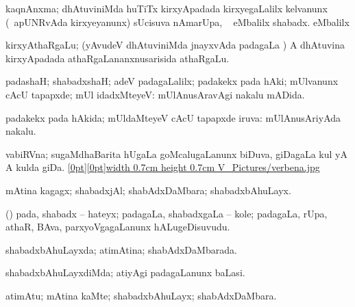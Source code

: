{{\bentry
{} 
\gl{\nA}
\expl{}
\bmng
 kaqnAnxma; dhAtuviniMda huTiTx kirxyApadada kirxyegaLalilx kelvanunx (\kanmu\ apUNRvAda kirxyeyanunx) sUcisuva nAmarUpa, \udA\  eMbalilx  shabadx.  eMbalilx  
\emng
\eentry

\bentry
{}
\gl{\nA}
\expl{}
\bmng
 kirxyAthaRgaLu; (yAvudeV dhAtuviniMda jnayxvAda padagaLa \vi) A dhAtuvina kirxyApadada athaRgaLananxnusarisida athaRgaLu. 
\emng
\eentry

\bentry
{} 
\gl{\kirxvi}
\expl{}
\bmng
 padashaH; shabadxshaH; adeV padagaLalilx; padakekx pada hAki; mUlvanunx cAcU tapapxde; mUl idadxMteyeV:  mUlAnusAravAgi nakalu mADida. 
\emng
\eentry

\bentry
{} 
\gl{\gu}
\expl{}
\bmng
 padakekx pada hAkida; mUldaMteyeV cAcU tapapxde iruva:  mUlAnusAriyAda nakalu. 
\emng
\eentry

\bentry
{} 
\gl{\nA}
\bmng
 vabiRVna; sugaMdhaBarita hUgaLa goMcalugaLanunx biDuva, giDagaLa kul yA A kulda giDa. \quad \hyperlink{verbenafigure}{\raisebox{-0.25cm}[0pt][0pt]{\pdfimage width 0.7cm height 0.7cm {V_Pictures/verbena.jpg}}} 
\emng
\eentry

\bentry
{} 
\gl{\nA}
\expl{}
\bmng
 mAtina kagagx; shabadxjAl; shabAdxDaMbara; shabadxbAhuLayx. 
\emng
\eentry

\bentry
{} 
\gl{\nA}
\expl{}
\bmng
 (\hA) pada, shabadx -- hateyx; padagaLa, shabadxgaLa -- kole; padagaLa, rUpa, athaR, BAva, parxyoVgagaLanunx hALugeDisuvudu. 
\emng
\eentry

\bentry
{} 
\gl{\gu}
\expl{}
\bmng
 shabadxbAhuLayxda; atimAtina; shabAdxDaMbarada. 
\emng
\eentry

\bentry
{} 
\gl{\kirxvi}
\expl{}
\bmng
 shabadxbAhuLayxdiMda; atiyAgi padagaLanunx baLasi. 
\emng
\eentry

\bentry
{} 
\gl{\nA}
\expl{}
\bmng
\emng
\eentry

\bentry
{} 
\gl{\nA}
\expl{}
\bmng
 atimAtu; mAtina kaMte; shabadxbAhuLayx; shabAdxDaMbara. 
\emng
\eentry

}}
